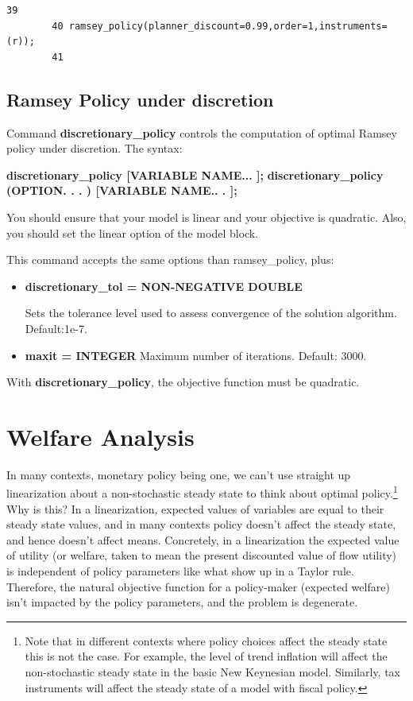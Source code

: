 \documentclass[cn,10pt,math=newtx,citestyle=gb7714-2015,bibstyle=gb7714-2015]{elegantbook}
\begin{document}
	\begin{lstlisting}[frame=shadowbox]
		39
		40 ramsey_policy(planner_discount=0.99,order=1,instruments=(r));
		41
	\end{lstlisting}
	
	\subsection{Ramsey Policy under discretion}
	
	Command \textbf{discretionary\_policy} controls the computation of optimal Ramsey policy under discretion. The syntax:
	
	\textbf{discretionary\_policy [VARIABLE NAME... ];}
	\textbf{discretionary\_policy (OPTION. . . ) [VARIABLE NAME.. . ];}
	
	You should ensure that your model is linear and your objective is quadratic. Also, you should set the linear option of the model block.
	
	This command accepts the same options than ramsey\_policy, plus:
	
	\begin{itemize}
		\item \textbf{discretionary\_tol = NON-NEGATIVE DOUBLE} 
		
		Sets the tolerance level used to assess convergence of the solution algorithm. Default:1e-7.
		
		\item \textbf{maxit = INTEGER} Maximum number of iterations. Default: 3000.
	\end{itemize}
	
	With \textbf{discretionary\_policy}, the objective function must be quadratic.
	
	\section{Welfare Analysis}
	
	In many contexts, monetary policy being one, we can't use straight up linearization about a non-stochastic steady state to think about optimal policy.\footnote{Note that in different contexts where policy choices affect the steady state this is not the case. For example, the level of trend inflation will affect the non-stochastic steady state in the basic New Keynesian model. Similarly, tax instruments will affect the steady state of a model with fiscal policy.} Why is this? In a linearization, expected values of variables are equal to their steady state values, and in many contexts policy doesn't affect
	the steady state, and hence doesn't affect means. Concretely, in a linearization the expected value of utility (or welfare, taken to mean the present discounted value of flow utility) is independent of policy parameters like what show up in a Taylor rule. Therefore, the natural objective function for a policy-maker (expected welfare) isn't impacted by the policy parameters, and the problem is degenerate.
	
\end{document}
